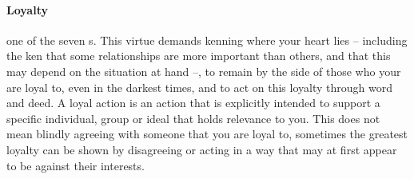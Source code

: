 \paragraph{Loyalty} one of the seven s. This virtue demands kenning where your heart lies – including the ken that some relationships are more important than others, and that this may depend on the situation at hand –, to remain by the side of those who your are loyal to, even in the darkest times, and to act on this loyalty through word and deed. A loyal action is an action that is explicitly intended to support a specific individual, group or ideal that holds relevance to you. This does not mean blindly agreeing with someone that you are loyal to, sometimes the greatest loyalty can be shown by disagreeing or acting in a way that may at first appear to be against their interests.
